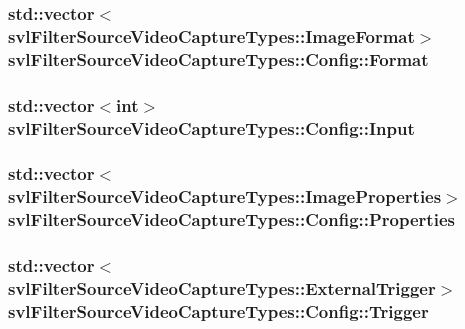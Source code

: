 \subsubsection[{Format}]{\setlength{\rightskip}{0pt plus 5cm}std\+::vector$<${\bf svl\+Filter\+Source\+Video\+Capture\+Types\+::\+Image\+Format}$>$ svl\+Filter\+Source\+Video\+Capture\+Types\+::\+Config\+::\+Format}\label{classsvl_filter_source_video_capture_types_1_1_config_a2bc1136b3413c972728318093224f6f0}
\hypertarget{classsvl_filter_source_video_capture_types_1_1_config_aaf5c493c57a549108677f3b83d75f2cd}{}
\subsubsection[{Input}]{\setlength{\rightskip}{0pt plus 5cm}std\+::vector$<$int$>$ svl\+Filter\+Source\+Video\+Capture\+Types\+::\+Config\+::\+Input}\label{classsvl_filter_source_video_capture_types_1_1_config_aaf5c493c57a549108677f3b83d75f2cd}
\hypertarget{classsvl_filter_source_video_capture_types_1_1_config_ab5daa0ef70017629bd9936bddd000a42}{}
\subsubsection[{Properties}]{\setlength{\rightskip}{0pt plus 5cm}std\+::vector$<${\bf svl\+Filter\+Source\+Video\+Capture\+Types\+::\+Image\+Properties}$>$ svl\+Filter\+Source\+Video\+Capture\+Types\+::\+Config\+::\+Properties}\label{classsvl_filter_source_video_capture_types_1_1_config_ab5daa0ef70017629bd9936bddd000a42}
\hypertarget{classsvl_filter_source_video_capture_types_1_1_config_a175a2e1c99c02c116b0d8dedf2d28cd9}{}
\subsubsection[{Trigger}]{\setlength{\rightskip}{0pt plus 5cm}std\+::vector$<${\bf svl\+Filter\+Source\+Video\+Capture\+Types\+::\+External\+Trigger}$>$ svl\+Filter\+Source\+Video\+Capture\+Types\+::\+Config\+::\+Trigger}\label{classsvl_filter_source_video_capture_types_1_1_config_a175a2e1c99c02c116b0d8dedf2d28cd9}


